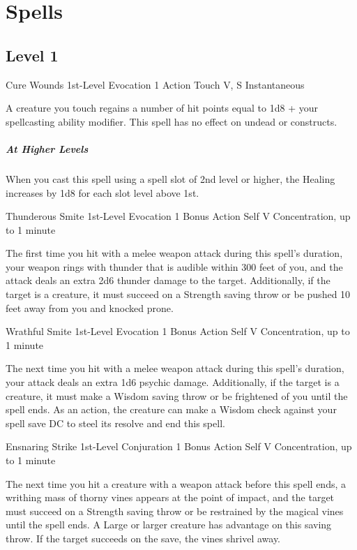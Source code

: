 \documentclass[letterpaper,openany,oneside,twocolumn]{book}
\begin{document}
\section*{Spells}
\subsection*{Level 1}

\DndSpellHeader
  {Cure Wounds}
  {1st-Level Evocation}
  {1 Action}
  {Touch}
  {V, S}
  {Instantaneous}

A creature you touch regains a number of hit points equal to 1d8 + your spellcasting ability modifier. This spell has no effect on undead or constructs.

\subparagraph*{At Higher Levels} When you cast this spell using a spell slot of 2nd level or higher, the Healing increases by 1d8 for each slot level above 1st.

\DndSpellHeader
  {Thunderous Smite}
  {1st-Level Evocation}
  {1 Bonus Action}
  {Self}
  {V}
  {Concentration, up to 1 minute}

The first time you hit with a melee weapon attack during this spell's duration, your weapon rings with thunder that is audible within 300 feet of you, and the attack deals an extra 2d6 thunder damage to the target. Additionally, if the target is a creature, it must succeed on a Strength saving throw or be pushed 10 feet away from you and knocked prone.

\DndSpellHeader
  {Wrathful Smite}
  {1st-Level Evocation}
  {1 Bonus Action}
  {Self}
  {V}
  {Concentration, up to 1 minute}

The next time you hit with a melee weapon attack during this spell's duration, your attack deals an extra 1d6 psychic damage. Additionally, if the target is a creature, it must make a Wisdom saving throw or be frightened of you until the spell ends. As an action, the creature can make a Wisdom check against your spell save DC to steel its resolve and end this spell.

\DndSpellHeader
  {Ensnaring Strike}
  {1st-Level Conjuration}
  {1 Bonus Action}
  {Self}
  {V}
  {Concentration, up to 1 minute}

The next time you hit a creature with a weapon attack before this spell ends, a writhing mass of thorny vines appears at the point of impact, and the target must succeed on a Strength saving throw or be restrained by the magical vines until the spell ends. A Large or larger creature has advantage on this saving throw. If the target succeeds on the save, the vines shrivel away.
\end{document}
